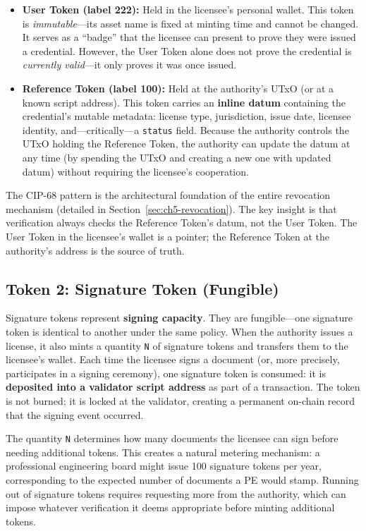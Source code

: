 \begin{itemize}[nosep]
  \item \textbf{User Token (label 222):} Held in the licensee's personal wallet. This token is \emph{immutable}---its asset name is fixed at minting time and cannot be changed. It serves as a ``badge'' that the licensee can present to prove they were issued a credential. However, the User Token alone does not prove the credential is \emph{currently valid}---it only proves it was once issued.
  \item \textbf{Reference Token (label 100):} Held at the authority's UTxO (or at a known script address). This token carries an \textbf{inline datum} containing the credential's mutable metadata: license type, jurisdiction, issue date, licensee identity, and---critically---a \texttt{status} field. Because the authority controls the UTxO holding the Reference Token, the authority can update the datum at any time (by spending the UTxO and creating a new one with updated datum) without requiring the licensee's cooperation.
\end{itemize}

The CIP-68 pattern is the architectural foundation of the entire revocation mechanism (detailed in Section~\ref{sec:ch5-revocation}). The key insight is that verification always checks the Reference Token's datum, not the User Token. The User Token in the licensee's wallet is a pointer; the Reference Token at the authority's address is the source of truth.

\subsection{Token 2: Signature Token (Fungible)}

Signature tokens represent \textbf{signing capacity}. They are fungible---one signature token is identical to another under the same policy. When the authority issues a license, it also mints a quantity \texttt{N} of signature tokens and transfers them to the licensee's wallet. Each time the licensee signs a document (or, more precisely, participates in a signing ceremony), one signature token is consumed: it is \textbf{deposited into a validator script address} as part of a transaction. The token is not burned; it is locked at the validator, creating a permanent on-chain record that the signing event occurred.

The quantity \texttt{N} determines how many documents the licensee can sign before needing additional tokens. This creates a natural metering mechanism: a professional engineering board might issue 100 signature tokens per year, corresponding to the expected number of documents a PE would stamp. Running out of signature tokens requires requesting more from the authority, which can impose whatever verification it deems appropriate before minting additional tokens.

